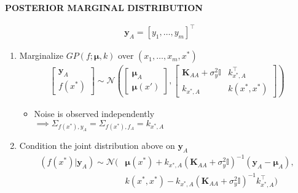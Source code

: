 \begin{whitebox}{\textbf{POSTERIOR MARGINAL DISTRIBUTION}}
\begin{itemize}
\begin{align*}
            \bm{y}_A=[y_1,\dots,y_m]^\top
        \end{align*}
        \begin{enumerate}
            \item Marginalize $GP(f;\bm{\mu},k)$ over $(x_1,\dots,x_m,x^*)$
            \begin{align*}
                \begin{bmatrix}
                    \bm{y}_A\\
                    f(x^*)
                \end{bmatrix}\sim\mathcal{N}\left(
                \begin{bmatrix}
                    \bm{\mu}_A\\
                    \bm{\mu}(x')
                \end{bmatrix},
                \begin{bmatrix}
                    \bm{K}_{AA}+\sigma_y^2\mathbb{I} & k_{x^*,A}^\top\\
                    k_{x^*,A} & k(x^*,x^*)
                \end{bmatrix}\right)
            \end{align*}
            \begin{itemize}
                \item Noise is observed independently\\
                $\implies\Sigma_{f(x^*),y_A}=\Sigma_{f(x^*),f_A}=k_{x^*,A}$
            \end{itemize}
            \item Condition the joint distribution above on $\bm{y}_A$
            \begin{align*}
                (f(x^*)|\bm{y}_A)\sim\mathcal{N}(&\bm{\mu}(x^*)+k_{x^*,A}(\bm{K}_{AA}+\sigma_y^2\mathbb{I})^{-1}(\bm{y}_A-\bm{\mu}_A),\\
                &k(x^*,x^*)-k_{x^*,A}(\bm{K}_{AA}+\sigma_y^2\mathbb{I})^{-1}k_{x^*,A}^\top)
            \end{align*}
        \end{enumerate}
    \end{itemize}
\end{whitebox}

